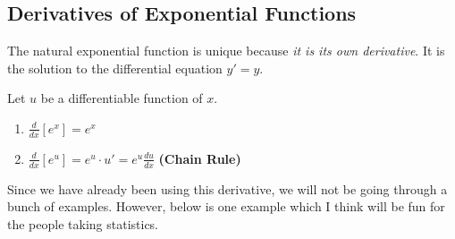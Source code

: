 \documentclass[12pt, letterpaper]{article}
\begin{document}
\subsection{Derivatives of Exponential Functions}

The natural exponential function is unique because \textit{it is its own derivative}. It is the solution to the differential equation $y' = y$.

\begin{theorem}[title=Derivative of the Natural Exponential Function]
    \tcblower
    Let $u$ be a differentiable function of $x$.
    \begin{enumerate}
        \item $\displaystyle \frac{d}{dx}[e^x] = e^x$
        \item $\displaystyle \frac{d}{dx}[e^u] = e^u \cdot u' = e^u \frac{du}{dx}$ \quad \textbf{(Chain Rule)}
    \end{enumerate}
\end{theorem}

Since we have already been using this derivative, we will not be going through a bunch of examples. However, below is one example which I think will be fun for the people taking statistics.
\end{document}
